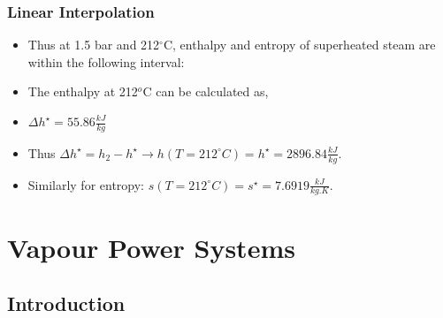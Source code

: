 \documentclass[10pt,compress,handout,ignorenonframetext]{beamer}
\begin{document}
\begin{frame}
  \frametitle{Linear Interpolation}
\noindent
\begin{itemize}
\item <1-> Thus at 1.5 bar and 212$^{\circ}$C, enthalpy and entropy of superheated steam are within the following interval:
\item<2-> The enthalpy at 212$^{o}$C can be calculated as,
\item <4-> $\Delta h^{\star}=55.86\frac{kJ}{kg}$ 
\item <4-> Thus $\Delta h^{\star}= h_{2}-h^{\star} \longrightarrow h\left(T=212^{\circ}C\right)=h^{\star}=2896.84\frac{kJ}{kg}$.
\item<5-> Similarly for entropy: $s\left(T=212^{\circ}C\right)=s^{\star}=7.6919\frac{kJ}{kg.K}$.
\end{itemize}

\end{frame}




\section{Vapour Power Systems}

\subsection{Introduction}
\end{document}
